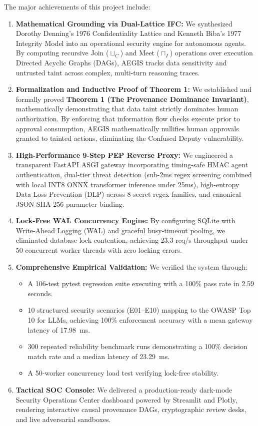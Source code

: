 The major achievements of this project include:
\begin{enumerate}
    \item \textbf{Mathematical Grounding via Dual-Lattice IFC:} We synthesized Dorothy Denning's 1976 Confidentiality Lattice \cite{denning1976lattice} and Kenneth Biba's 1977 Integrity Model \cite{biba1977integrity} into an operational security engine for autonomous agents. By computing recursive Join ($\sqcup_C$) and Meet ($\sqcap_I$) operations over execution Directed Acyclic Graphs (DAGs), AEGIS tracks data sensitivity and untrusted taint across complex, multi-turn reasoning traces.
    \item \textbf{Formalization and Inductive Proof of Theorem 1:} We established and formally proved \textbf{Theorem 1 (The Provenance Dominance Invariant)}, mathematically demonstrating that data taint strictly dominates human authorization. By enforcing that information flow checks execute prior to approval consumption, AEGIS mathematically nullifies human approvals granted to tainted actions, eliminating the Confused Deputy vulnerability.
    \item \textbf{High-Performance 9-Step PEP Reverse Proxy:} We engineered a transparent FastAPI ASGI gateway incorporating timing-safe HMAC agent authentication, dual-tier threat detection (sub-2ms regex screening combined with local INT8 ONNX transformer inference under 25ms), high-entropy Data Loss Prevention (DLP) across 8 secret regex families, and canonical JSON SHA-256 parameter binding.
    \item \textbf{Lock-Free WAL Concurrency Engine:} By configuring SQLite with Write-Ahead Logging (WAL) and graceful busy-timeout pooling, we eliminated database lock contention, achieving 23.3 req/s throughput under 50 concurrent worker threads with zero locking errors.
    \item \textbf{Comprehensive Empirical Validation:} We verified the system through:
    \begin{itemize}
        \item A 106-test pytest regression suite executing with a 100\% pass rate in 2.59 seconds.
        \item 10 structured security scenarios (E01--E10) mapping to the OWASP Top 10 for LLMs, achieving 100\% enforcement accuracy with a mean gateway latency of 17.98~ms.
        \item 300 repeated reliability benchmark runs demonstrating a 100\% decision match rate and a median latency of 23.29~ms.
        \item A 50-worker concurrency load test verifying lock-free stability.
    \end{itemize}
    \item \textbf{Tactical SOC Console:} We delivered a production-ready dark-mode Security Operations Center dashboard powered by Streamlit and Plotly, rendering interactive causal provenance DAGs, cryptographic review desks, and live adversarial sandboxes.
\end{enumerate}

